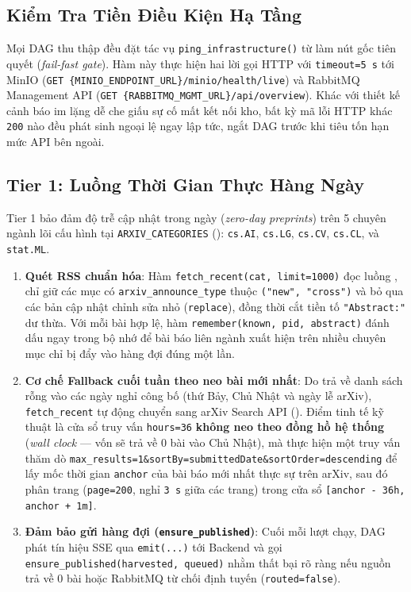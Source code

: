 \subsection{Kiểm Tra Tiền Điều Kiện Hạ Tầng}
\label{sec:ch2_preflight}

Mọi DAG thu thập đều đặt tác vụ \texttt{ping\_infrastructure()} từ  làm nút gốc tiên quyết (\textit{fail-fast gate}). Hàm này thực hiện hai lời gọi HTTP với \texttt{timeout=5 s} tới MinIO (\texttt{GET \{MINIO\_ENDPOINT\_URL\}/minio/health/live}) và RabbitMQ Management API (\texttt{GET \{RABBITMQ\_MGMT\_URL\}/api/overview}). Khác với thiết kế cảnh báo im lặng dễ che giấu sự cố mất kết nối kho, bất kỳ mã lỗi HTTP khác \texttt{200} nào đều phát sinh ngoại lệ ngay lập tức, ngắt DAG trước khi tiêu tốn hạn mức API bên ngoài.

\subsection{Tier 1: Luồng Thời Gian Thực Hàng Ngày}
\label{sec:ch2_tier1}

Tier 1 bảo đảm độ trễ cập nhật trong ngày (\textit{zero-day preprints}) trên 5 chuyên ngành lõi cấu hình tại \texttt{ARXIV\_CATEGORIES} (): \texttt{cs.AI}, \texttt{cs.LG}, \texttt{cs.CV}, \texttt{cs.CL}, và \texttt{stat.ML}.
\begin{enumerate}[label=\textbf{\arabic*.}]
  \item \textbf{Quét RSS chuẩn hóa}: Hàm \texttt{fetch\_recent(cat, limit=1000)} đọc luồng , chỉ giữ các mục có \texttt{arxiv\_announce\_type} thuộc \texttt{("new", "cross")} và bỏ qua các bản cập nhật chỉnh sửa nhỏ (\texttt{replace}), đồng thời cắt tiền tố \texttt{"Abstract:"} dư thừa. Với mỗi bài hợp lệ, hàm \texttt{remember(known, pid, abstract)} đánh dấu ngay trong bộ nhớ để bài báo liên ngành xuất hiện trên nhiều chuyên mục chỉ bị đẩy vào hàng đợi đúng một lần.
  \item \textbf{Cơ chế Fallback cuối tuần theo neo bài mới nhất}: Do  trả về danh sách rỗng vào các ngày nghỉ công bố (thứ Bảy, Chủ Nhật và ngày lễ arXiv), \texttt{fetch\_recent} tự động chuyển sang arXiv Search API (). Điểm tinh tế kỹ thuật là cửa sổ truy vấn \texttt{hours=36} \textbf{không neo theo đồng hồ hệ thống} (\textit{wall clock} --- vốn sẽ trả về 0 bài vào Chủ Nhật), mà thực hiện một truy vấn thăm dò \texttt{max\_results=1\&sortBy=submittedDate\&sortOrder=descending} để lấy mốc thời gian \texttt{anchor} của bài báo mới nhất thực sự trên arXiv, sau đó phân trang (\texttt{page=200}, nghỉ \texttt{3 s} giữa các trang) trong cửa sổ \texttt{[anchor - 36h, anchor + 1m]}.
  \item \textbf{Đảm bảo gửi hàng đợi (\texttt{ensure\_published})}: Cuối mỗi lượt chạy, DAG phát tín hiệu SSE qua \texttt{emit(...)} tới Backend và gọi \texttt{ensure\_published(harvested, queued)} nhằm thất bại rõ ràng nếu nguồn trả về 0 bài hoặc RabbitMQ từ chối định tuyến (\texttt{routed=false}).
\end{enumerate}

